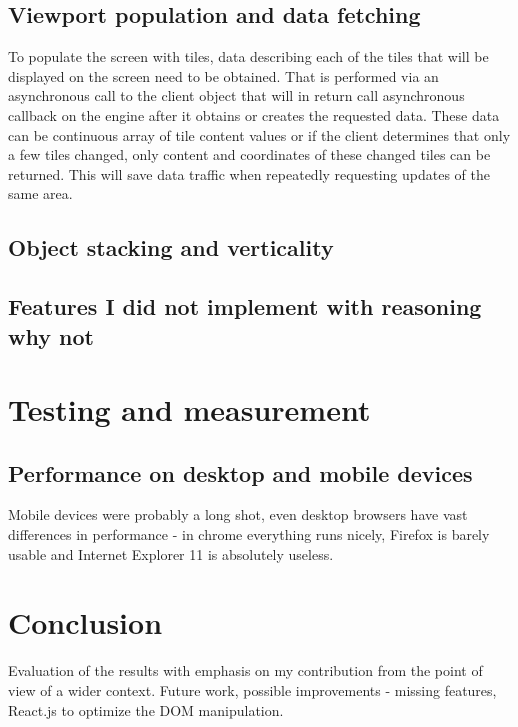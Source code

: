 \documentclass[11pt,oneside, final]{fithesis2}
\begin{document}
\section{Viewport population and data fetching}
To populate the screen with tiles, data describing each of the tiles that will be displayed on the screen need to be obtained. That is performed via an asynchronous call to the client object that will in return call asynchronous callback on the engine after it obtains or creates the requested data. These data can be continuous array of tile content values or if the client determines that only a few tiles changed, only content and coordinates of these changed tiles can be returned. This will save data traffic when repeatedly requesting updates of the same area.

\section{Object stacking and verticality}

\section{Features I did not implement with reasoning why not}

\chapter{Testing and measurement}
\label{testing}

\section{Performance on desktop and mobile devices}
Mobile devices were probably a long shot, even desktop browsers have vast differences in performance - in chrome everything runs nicely, Firefox is barely usable and Internet Explorer 11 is absolutely useless.

\chapter{Conclusion}
Evaluation of the results with emphasis on my contribution from the point of view of a wider context.
Future work, possible improvements - missing features, React.js to optimize the DOM manipulation.

\end{document}
